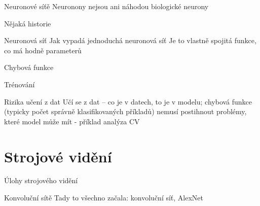 \documentclass[aspectratio=169,dvipsnames]{beamer}
\begin{document}
\begin{frame}{Neuronové síťě}
Neuronony nejsou ani náhodou biologické neurony

Nějaká historie
\end{frame}

\begin{frame}{Neuronová síť}
Jak vypadá jednoduchá neuronová síť
Je to vlastně spojitá funkce, co má hodně parameterů
\end{frame}

\begin{frame}{Chybová funkce}
\end{frame}

\begin{frame}{Trénování}
\end{frame}

\begin{frame}{Rizika učení z dat}
Učí se z dat -- co je v datech, to je v modelu; chybová funkce (typicky počet správně klasifikovaných příkladů) nemusí postihnout problémy, které model může mít - příklad analýza CV

\end{frame}

\begin{frame}{}
\end{frame}


\section{Strojové vidění}

\begin{frame}{Úlohy strojového vidění}
\end{frame}

\begin{frame}{Konvoluční sítě}
Tady to všechno začala: konvoluční síť, AlexNet

    \scalebox{0.8}{}

\end{frame}

\end{document}
